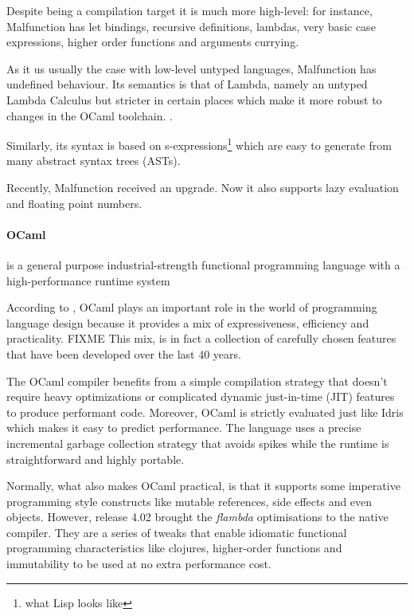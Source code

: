 \documentclass[a4paper,11pt,twocolumn]{article}
\begin{document}
Despite being a compilation target it is much more high-level:
for instance, Malfunction has
let bindings, recursive definitions, lambdas, very basic case
expressions, higher order functions and arguments currying.

As it us usually the case with low-level untyped languages, Malfunction
has undefined behaviour.
Its semantics is that of Lambda, namely an untyped Lambda Calculus but
stricter in certain places which make it more robust to changes in the
OCaml toolchain. \cite{dolan2016malfunctional}.

Similarly, its syntax is based on s-expressions\footnote{
    what Lisp looks like
} which are easy to generate from many abstract syntax trees (ASTs).

Recently, Malfunction received an upgrade.
Now it also supports lazy evaluation and
floating point numbers.


\paragraph{OCaml} is a general purpose industrial-strength functional
programming language with a high-performance runtime system

According to \cite{rwocaml}, OCaml plays an important role in the
world of programming language design because it provides a mix
of expressiveness, efficiency and practicality.
FIXME This mix, is in fact a collection of carefully chosen features
that have been developed over the last 40 years.


The OCaml compiler benefits from a simple
compilation strategy that doesn't require heavy optimizations or
complicated dynamic just-in-time (JIT) features to produce performant
code. Moreover, OCaml is strictly evaluated just like Idris which
makes it easy to predict performance.
The language uses  a precise incremental garbage collection strategy
that avoids spikes while the runtime is straightforward and highly
portable.

Normally, what also makes OCaml practical, is that it supports some
imperative programming style constructs like mutable references,
side effects and even objects.
However, release 4.02 brought the \emph{flambda} optimisations to the
native compiler. They are a series of tweaks
that enable idiomatic functional programming characteristics like clojures,
higher-order functions and immutability to be used at no extra
performance cost.\cite{leroy2014ocaml}
\end{document}
